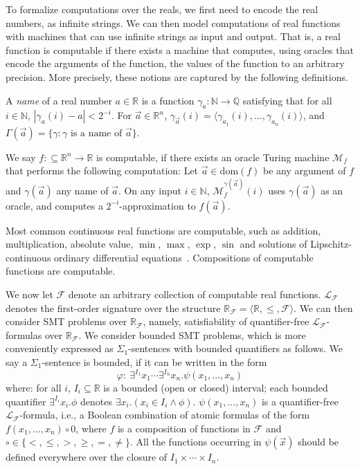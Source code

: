 \documentclass[envcountsect]{llncs}
\newcommand{\dom}{\mathrm{dom}}
\begin{document}
To formalize computations over the reals, we first need to encode the real
numbers, as infinite strings. We can then model
computations of real functions with machines that can use infinite strings as
input and output. That is, a real function is computable if there exists a
machine that computes, using oracles that encode the arguments of the function,
the values of the function to an arbitrary precision. More precisely, these
notions are captured by the following definitions. 
\begin{definition}
A {\em name} of a real number $a\in \mathbb{R}$ is a function
$\mathcal{\gamma}_a: \mathbb{N}\rightarrow \mathbb{Q}$ satisfying that for all
$i\in \mathbb{N}$, $|\gamma_a(i) - a|<2^{-i}.$ For $\vec a\in \mathbb{R}^n$,
$\gamma_{\vec a}(i) = \langle \gamma_{a_1}(i), ..., \gamma_{a_n}(i)\rangle$, and
$\Gamma(\vec a) = \{\gamma: \gamma\mbox{ is a name of }\vec a\}$. 
\end{definition}
\begin{definition} We say
$f:\subseteq\mathbb{R}^n\rightarrow \mathbb{R}$ is computable, if there exists
an oracle Turing machine $\mathcal{M}_f$ that performs the following
computation: Let $\vec a\in \dom(f)$ be any argument of $f$ and $\gamma(\vec a)$
any name of $\vec a$. On any input $i\in \mathbb{N}$,
$\mathcal{M}_f^{\gamma(\vec a)}(i)$ uses $\gamma(\vec a)$ as an oracle, and
computes a $2^{-i}$-approximation to $f(\vec a)$. 
\end{definition}
Most common continuous real functions are computable, such as addition,
multiplication,  absolute value, $\min$, $\max$, $\exp$, $\sin$ and solutions of
Lipschitz-continuous ordinary differential equations~\cite{CAbook}. Compositions
of computable functions are computable.

We now let $\mathcal{F}$ denote an arbitrary collection of computable real
functions. $\mathcal{L}_{\mathcal{F}}$ denotes the first-order signature over
the structure $\mathbb{R}_{\mathcal{F}} = \langle
\mathbb{R}, \leq, \mathcal{F}\rangle$. We can then consider SMT problems
over $\mathbb{R}_{\mathcal{F}}$, namely, satisfiability of quantifier-free
$\mathcal{L}_{\mathcal{F}}$-formulas over $\mathbb{R}_{\mathcal{F}}$. We
consider bounded SMT problems, which is more conveniently expressed as
$\Sigma_1$-sentences with bounded quantifiers as follows. We say a
$\Sigma_1$-sentence is bounded, if it can be written in the form
$$\varphi:\ \exists^{I_1}x_1\cdots \exists^{I_n}x_n. \psi(x_1,...,x_n)$$
where: for all $i$, $I_i\subseteq \mathbb{R}$ is a bounded (open or closed)
interval; each bounded quantifier $\exists^{I_i}x_i.\phi$ denotes $\exists
x_i.(x_i\in I_i\wedge \phi)$. $\psi(x_1,...,x_n)$ is a quantifier-free
$\mathcal{L}_{\mathcal{F}}$-formula, i.e., a Boolean combination of atomic
formulas of the form $f(x_1,...,x_n)\circ 0$, where $f$ is a composition of
functions in $\mathcal{F}$ and $\circ\in\{<,\leq, >, \geq, =, \neq \}$. 
All the functions occurring in $\psi(\vec x)$ should be defined everywhere over
the closure of $I_1\times\cdots \times I_n$. 
\end{document}
